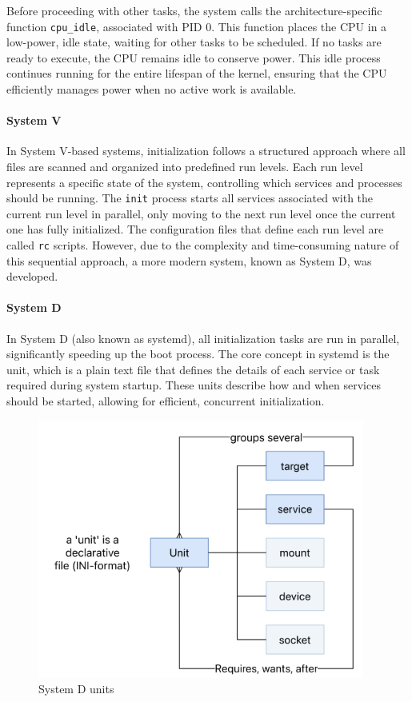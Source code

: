Before proceeding with other tasks, the system calls the architecture-specific function \texttt{cpu\_idle}, associated with PID 0.
This function places the CPU in a low-power, idle state, waiting for other tasks to be scheduled. 
If no tasks are ready to execute, the CPU remains idle to conserve power. 
This idle process continues running for the entire lifespan of the kernel, ensuring that the CPU efficiently manages power when no active work is available.

\paragraph*{System V}
In System V-based systems, initialization follows a structured approach where all files are scanned and organized into predefined run levels. Each run level represents a specific state of the system, controlling which services and processes should be running. 
The \texttt{init} process starts all services associated with the current run level in parallel, only moving to the next run level once the current one has fully initialized. 
The configuration files that define each run level are called \texttt{rc} scripts. 
However, due to the complexity and time-consuming nature of this sequential approach, a more modern system, known as System D, was developed.

\paragraph*{System D}
In System D (also known as systemd), all initialization tasks are run in parallel, significantly speeding up the boot process. 
The core concept in systemd is the unit, which is a plain text file that defines the details of each service or task required during system startup. 
These units describe how and when services should be started, allowing for efficient, concurrent initialization.
\begin{figure}[H]
    \centering
    \includegraphics[width=0.75\linewidth]{images/unit.png}
    \caption{System D units}
\end{figure}